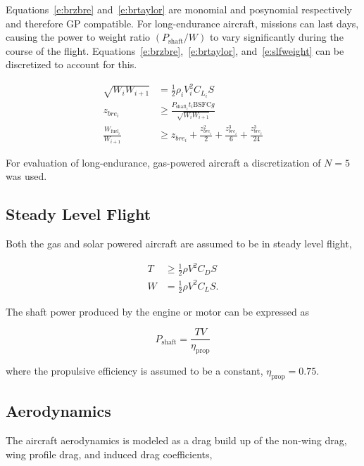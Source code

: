     Equations~\eqref{e:brzbre} and~\eqref{e:brtaylor} are monomial and posynomial respectively and therefore GP compatible. For long-endurance aircraft, missions can last days, causing the power to weight ratio $(P_{\text{shaft}}/W)$ to vary significantly during the course of the flight.  
    Equations~\eqref{e:brzbre},~\eqref{e:brtaylor}, and~\eqref{e:slfweight} can be discretized to account for this.

\begin{align}
    \label{e:slfweightd}
    \sqrt{W_i W_{i+1}} &= \frac{1}{2} \rho_i V_i^2 C_{L_i} S \\
    \label{e:brzbred}
    z_{bre_i} &\geq \frac{P_{\text{shaft}_i}t_i \text{BSFC} g}{\sqrt{W_i W_{i+1}}}\\
    \label{e:brtaylord}
    \frac{W_{\text{fuel}_i}}{W_{i+1}} &\geq z_{bre_i} + \frac{z_{bre_i}^2}{2} + \frac{z_{bre_i}^3}{6} + \frac{z_{bre_i}^3}{24} 
    \end{align}

    For evaluation of long-endurance, gas-powered aircraft a discretization of $N=5$ was used. 

\subsection{Steady Level Flight}

Both the gas and solar powered aircraft are assumed to be in steady level flight,\cite{hoburgthesis}

\begin{align}
    \label{e:slfthrust}
    T &\geq \frac{1}{2} \rho V^2 C_D S\\
    \label{e:slfweight}
    W &= \frac{1}{2} \rho V^2 C_L S. 
\end{align}

The shaft power produced by the engine or motor can be expressed as  

\begin{equation}
    \label{e:slfpower}
    P_{\text{shaft}} = \frac{TV}{\eta_{\text{prop}}}
    \end{equation}

    where the propulsive efficiency is assumed to be a constant, $\eta_{\text{prop}} = 0.75$. 

\subsection{Aerodynamics}

The aircraft aerodynamics is modeled as a drag build up of the non-wing drag, wing profile drag, and induced drag coefficients, 

